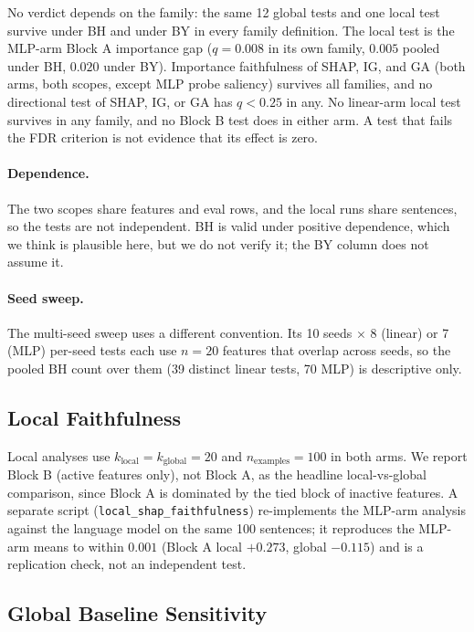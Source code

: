 No verdict depends on the family: the same 12 global tests and one local test
survive under BH and under BY in every family definition. The local test
is the MLP-arm Block A importance gap ($q=0.008$ in its own
family, $0.005$ pooled under BH, $0.020$ under BY). Importance faithfulness of
SHAP, IG, and GA (both arms, both scopes, except MLP probe saliency) survives
all families, and no directional test of SHAP, IG, or GA has $q<0.25$ in any.
No linear-arm local test survives in any family, and no Block B test does in
either arm. A
test that fails the FDR criterion is not evidence that its effect is zero.

\paragraph{Dependence.} The two scopes share features and eval rows, and the
local runs share sentences, so the tests are not independent. BH is valid under
positive dependence, which we think is plausible here, but we do not
verify it; the BY column does not assume it.

\paragraph{Seed sweep.} The multi-seed sweep uses a different convention. Its
10 seeds $\times$ 8 (linear) or 7 (MLP) per-seed tests each use $n=20$
features that overlap across seeds, so the pooled BH count over them (39 distinct linear tests, 70 MLP) is descriptive only.

\subsection{Local Faithfulness}
\label{app:local}

Local analyses use $k_{\text{local}}=k_{\text{global}}=20$ and
$n_{\text{examples}}=100$ in both arms. We report Block B (active features
only), not Block A, as the headline local-vs-global comparison, since
Block A is dominated by the tied block of inactive features.
A separate script (\texttt{local\_shap\_faithfulness}) re-implements the
MLP-arm analysis against the language model on the same 100 sentences; it
reproduces the MLP-arm means to within $0.001$ (Block A local $+0.273$, global
$-0.115$) and is a replication check, not an independent test.

\subsection{Global Baseline Sensitivity}
\label{app:global-baseline}

